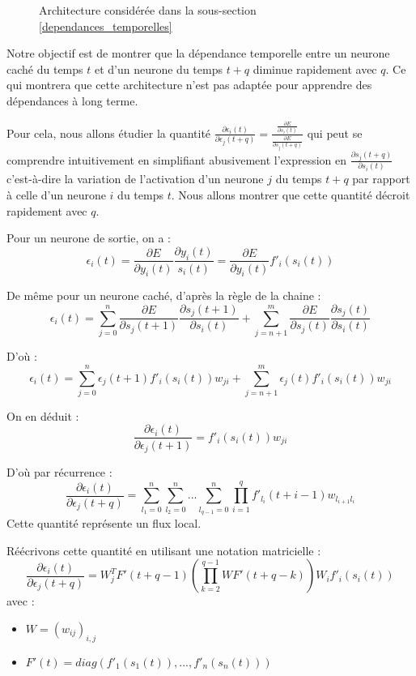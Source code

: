 \begin{figure}
\begin{center}

\caption{Architecture considérée dans la sous-section \ref{dependances_temporelles}}
\label{archi_dep_tempo}
\end{center}
\end{figure}

Notre objectif est de montrer que la dépendance temporelle entre un neurone caché du temps $t$ et d'un neurone du temps $t + q$ diminue rapidement avec $q$. Ce qui montrera que cette architecture n'est pas adaptée pour apprendre des dépendances à long terme.

Pour cela, nous allons étudier la quantité $\frac{\partial \epsilon_i(t)}{\partial \epsilon_j(t+q)} = \frac{\frac{\partial E}{\partial s_i(t)}}{\frac{\partial E}{\partial s_j(t+q)}}$ qui peut se comprendre intuitivement en simplifiant abusivement l'expression en $\frac{\partial s_j(t+q)}{\partial s_i(t)}$ c'est-à-dire la variation de l'activation d'un neurone $j$ du temps $t+q$ par rapport à celle d'un neurone $i$ du temps $t$. Nous allons montrer que cette quantité décroit rapidement avec $q$.

Pour un neurone de sortie, on a :
$$
\epsilon_i(t) = \frac{\partial E}{\partial y_i(t)}\frac{\partial y_i(t)}{s_i(t)} = \frac{\partial E}{\partial y_i(t)}f'_i(s_i(t))
$$

De même pour un neurone caché, d'après la règle de la chaine :
$$
\epsilon_i(t) = \sum_{j = 0}^{n}{\frac{\partial E}{\partial s_j(t+1)}\frac{\partial s_j(t+1)}{\partial s_i(t)}} + \sum_{j = n+1}^{m}{\frac{\partial E}{\partial s_j(t)}\frac{\partial s_j(t)}{\partial s_i(t)}}
$$

D'où :
$$
\epsilon_i(t) = \sum_{j = 0}^{n}{\epsilon_j(t+1)f'_i(s_i(t))w_{ji}} + \sum_{j = n+1}^{m}{\epsilon_j(t)f'_i(s_i(t))w_{ji}}
$$

On en déduit :
$$
\frac{\partial \epsilon_i(t)}{\partial \epsilon_j(t+1)} = f'_i(s_i(t))w_{ji}
$$

D'où par récurrence :
$$
\frac{\partial \epsilon_i(t)}{\partial \epsilon_j(t+q)} = \sum_{l_1 = 0}^{n}{\sum_{l_2 = 0}^{n}{...\sum_{l_{q-1} = 0}^{n}{\prod_{i=1}^{q}{f'_{l_i}(t+i-1)w_{l_{i+1}l_i}}}}}
$$
Cette quantité représente un flux local.

Réécrivons cette quantité en utilisant une notation matricielle :
$$
\frac{\partial \epsilon_i(t)}{\partial \epsilon_j(t+q)} = W_j^TF'(t + q - 1)(\prod_{k = 2}^{q-1}{WF'(t + q - k)})W_if'_i(s_i(t))
$$
avec : 
\begin{itemize}
\item $W = (w_{ij})_{i,j}$
\item $F'(t) = diag(f'_1(s_1(t)), ..., f'_n(s_n(t)))$
\end{itemize}

